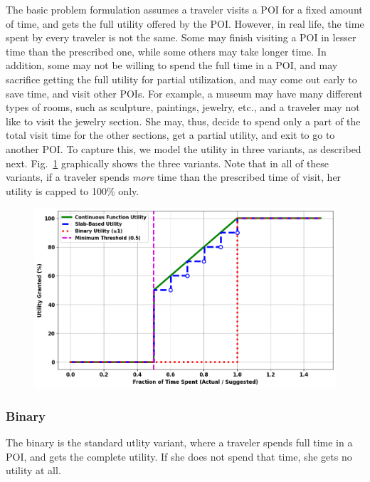 The basic problem formulation assumes a traveler visits a POI for a fixed amount
of time, and gets the full utility offered by the POI.  However, in real life,
the time spent by every traveler is not the same.  Some may finish visiting a
POI in lesser time than the prescribed one, while some others may take longer
time.  In addition, some may not be willing to spend the full time in a POI, and
may sacrifice getting the full utility for partial utilization, and may come out
early to save time, and visit other POIs.  For example, a museum may have many
different types of rooms, such as sculpture, paintings, jewelry, etc., and a
traveler may not like to visit the jewelry section.  She may, thus, decide to
spend only a part of the total visit time for the other sections, get a partial
utility, and exit to go to another POI.  To capture this, we model the utility
in three variants, as described next.
Fig.~\ref{fig:utility} graphically shows the three variants.
Note that in all of these variants, if a traveler spends \emph{more} time
than the prescribed time of visit, her utility is capped to 100\% only.

\begin{figure}[t]
\centering
\includegraphics[width=0.95\columnwidth]{plots/UF_Combined.png}
\label{fig:utility}
\end{figure}

\subsubsection{\textbf{Binary}}
\label{sec:binary}

The binary is the standard utlity variant, where a traveler spends full time in
a POI, and gets the complete utility.  If she does not spend that time, she gets
no utility at all.

